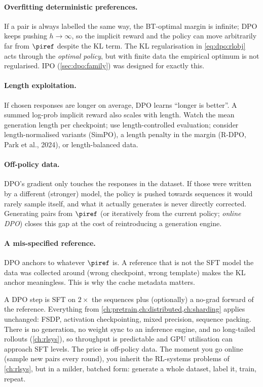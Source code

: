 \paragraph{Overfitting deterministic preferences.} If a pair is always labelled the same way, the
BT-optimal margin is infinite; DPO keeps pushing $h\to\infty$, so the implicit reward and the
policy can move arbitrarily far from $\piref$ despite the KL term. The KL regularisation in
\eqref{eq:dpo:rlobj} acts through the \emph{optimal policy}, but with finite data the empirical
optimum is not regularised. IPO (\cref{sec:dpo:family}) was designed for exactly this.

\paragraph{Length exploitation.} If chosen responses are longer on average, DPO learns
``longer is better''. A summed log-prob implicit reward also scales with length. Watch the mean
generation length per checkpoint; use length-controlled evaluation; consider length-normalised
variants (SimPO), a length penalty in the margin (R-DPO, Park et al., 2024), or length-balanced data.

\paragraph{Off-policy data.} DPO's gradient only touches the responses in the dataset. If those
were written by a different (stronger) model, the policy is pushed towards sequences it would
rarely sample itself, and what it actually generates is never directly corrected. Generating pairs
from $\piref$ (or iteratively from the current policy; \emph{online DPO}) closes this gap at the
cost of reintroducing a generation engine.

\paragraph{A mis-specified reference.} DPO anchors to whatever $\piref$ is. A reference that is not
the SFT model the data was collected around (wrong checkpoint, wrong template) makes the KL
anchor meaningless. This is why the cache metadata matters.

\begin{systemslens}
A DPO step is SFT on $2\times$ the sequences plus (optionally) a no-grad forward of the
reference. Everything from \cref{ch:pretrain,ch:distributed,ch:sharding} applies unchanged:
FSDP, activation checkpointing, mixed precision, sequence packing. There is no generation, no
weight sync to an inference engine, and no long-tailed rollouts (\cref{ch:rlsys}), so throughput is
predictable and GPU utilisation can approach SFT levels. The price is off-policy data. The moment
you go online (sample new pairs every round), you inherit the RL-systems problems of
\cref{ch:rlsys}, but in a milder, batched form: generate a whole dataset, label it, train, repeat.
\end{systemslens}

